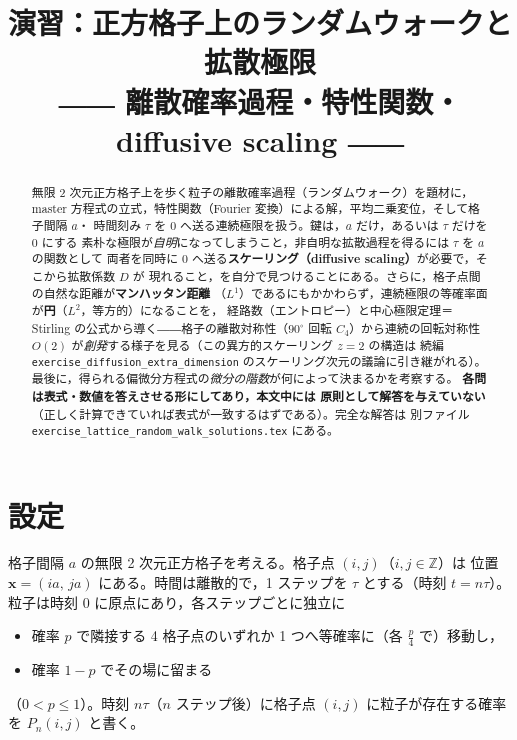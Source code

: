 \documentclass[dvipdfmx, uplatex]{jsarticle}
\title{演習：正方格子上のランダムウォークと拡散極限\\
\large ―― 離散確率過程・特性関数・diffusive scaling ――}
\author{}
\date{}
\newcommand{\bx}{\bm{x}}
\theoremstyle{definition}
\begin{document}
\maketitle
\vspace{-6zh}

\begin{abstract}
無限 2 次元正方格子上を歩く粒子の離散確率過程（ランダムウォーク）を題材に，
master 方程式の立式，特性関数（Fourier 変換）による解，平均二乗変位，そして格子間隔 $a$・
時間刻み $\tau$ を $0$ へ送る連続極限を扱う。鍵は，$a$ だけ，あるいは $\tau$ だけを $0$ にする
素朴な極限が\emph{自明}になってしまうこと，非自明な拡散過程を得るには $\tau$ を $a$ の関数として
両者を同時に $0$ へ送る\textbf{スケーリング（diffusive scaling）}が必要で，そこから拡散係数 $D$ が
現れること，を自分で見つけることにある。さらに，格子点間の自然な距離が\textbf{マンハッタン距離}
（$L^1$）であるにもかかわらず，連続極限の等確率面が\textbf{円}（$L^2$，等方的）になることを，
経路数（エントロピー）と中心極限定理＝Stirling の公式から導く――格子の離散対称性（$90^\circ$ 回転
$C_4$）から連続の回転対称性 $O(2)$ が\emph{創発}する様子を見る（この異方的スケーリング $z=2$ の構造は
続編 \texttt{exercise\_diffusion\_extra\_dimension} のスケーリング次元の議論に引き継がれる）。
最後に，得られる偏微分方程式の\emph{微分の階数}が何によって決まるかを考察する。
\textbf{各問は表式・数値を答えさせる形にしてあり，本文中には
原則として解答を与えていない}（正しく計算できていれば表式が一致するはずである）。完全な解答は
別ファイル \texttt{exercise\_lattice\_random\_walk\_solutions.tex} にある。
\end{abstract}

\tableofcontents

\section{設定}
格子間隔 $a$ の無限 2 次元正方格子を考える。格子点 $(i,j)$（$i,j\in\mathbb{Z}$）は
位置 $\bx=(ia,\,ja)$ にある。時間は離散的で，1 ステップを $\tau$ とする（時刻 $t=n\tau$）。
粒子は時刻 $0$ に原点にあり，各ステップごとに独立に
\begin{itemize}
\item 確率 $p$ で隣接する 4 格子点のいずれか 1 つへ等確率に（各 $\tfrac{p}{4}$ で）移動し，
\item 確率 $1-p$ でその場に留まる
\end{itemize}
（$0<p\le1$）。時刻 $n\tau$（$n$ ステップ後）に格子点 $(i,j)$ に粒子が存在する確率を
$P_n(i,j)$ と書く。
\end{document}
